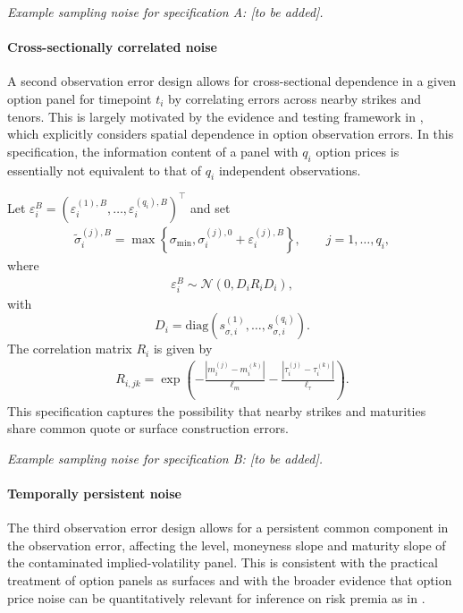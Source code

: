 \documentclass[11pt,a4paper,notitlepage]{article}
\numberwithin{equation}{section}
\begin{document}
\emph{Example sampling noise for specification A: [to be added].}

\paragraph{Cross-sectionally correlated noise}
A second observation error design allows for cross-sectional dependence in a given option panel for timepoint $t_i$ by correlating errors across nearby strikes and tenors. This is largely motivated by the evidence and testing framework in \cite{andersen2021spatial}, which explicitly considers spatial dependence in option observation errors. In this specification, the information content of a panel with $q_i$ option prices is essentially not equivalent to that of $q_i$ independent observations.

Let
$\varepsilon_i^B=\left(\varepsilon_i^{(1),B},\ldots,\varepsilon_i^{(q_i),B}\right)^\top$ and set
\begin{align}
\tilde\sigma_i^{(j),B}
=
\max\left\{
\sigma_{\min},
\sigma_i^{(j),0}
+
\varepsilon_i^{(j),B}
\right\},
\qquad
j=1,\ldots,q_i,
\label{eq:noise_spatial_iv}
\end{align}
where
\begin{align}
\varepsilon_i^B\sim\mathcal{N}(0,D_i R_i D_i),
\label{eq:noise_spatial}
\end{align}
with
\[
D_i=\mathrm{diag}\left(s_{\sigma,i}^{(1)},\ldots,s_{\sigma,i}^{(q_i)}\right).
\]
The correlation matrix $R_i$ is given by
\begin{align}
R_{i,jk}
=
\exp\left(
-\frac{|m_i^{(j)}-m_i^{(k)}|}{\ell_m}
-\frac{|\tau_i^{(j)}-\tau_i^{(k)}|}{\ell_\tau}
\right).
\label{eq:spatial_kernel}
\end{align}
This specification captures the possibility that nearby strikes and maturities share common quote or surface construction errors.

\emph{Example sampling noise for specification B: [to be added].}

\paragraph{Temporally persistent noise}
The third observation error design allows for a persistent common component in the observation error, affecting the level, moneyness slope and maturity slope of the contaminated implied-volatility panel. This is consistent with the practical treatment of option panels as surfaces and with the broader evidence that option price noise can be quantitatively relevant for inference on risk premia as in \cite{duarte2024very}.
\end{document}
